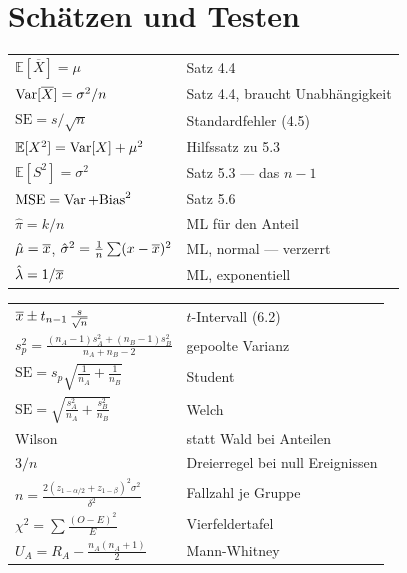 \section{Schätzen und Testen}

\begin{merksatz}
\begin{center}
{\small
\renewcommand{\arraystretch}{1.6}
\begin{tabular}{@{}P{4.4cm}P{4.2cm}@{}}
\toprule
$\mathbb{E}[\overline X] = \mu$ & Satz 4.4\\
$\operatorname{Var}[\overline X] = \sigma^2/n$ & Satz 4.4, braucht Unabhängigkeit\\
$\mathrm{SE} = s/\sqrt n$ & Standardfehler (4.5)\\
$\mathbb{E}[X^2] = \operatorname{Var}[X] + \mu^2$ & Hilfssatz zu 5.3\\
$\mathbb{E}[S^2] = \sigma^2$ & Satz 5.3 --- das $n-1$\\
$\mathrm{MSE} = \operatorname{Var} + \mathrm{Bias}^2$ & Satz 5.6\\
$\hat\pi = k/n$ & ML für den Anteil\\
$\hat\mu = \overline{x}$, $\hat\sigma^2 = \frac1n\sum(x-\overline{x})^2$ & ML, normal --- verzerrt\\
$\hat\lambda = 1/\overline{x}$ & ML, exponentiell\\
\bottomrule
\end{tabular}}
\end{center}
\end{merksatz}

\begin{merksatz}
\begin{center}
{\small
\renewcommand{\arraystretch}{1.6}
\begin{tabular}{@{}P{4.4cm}P{4.2cm}@{}}
\toprule
$\overline{x} \pm t_{n-1}\,\frac{s}{\sqrt n}$ & $t$-Intervall (6.2)\\
$s_p^2 = \frac{(n_A-1)s_A^2+(n_B-1)s_B^2}{n_A+n_B-2}$ & gepoolte Varianz\\
$\mathrm{SE} = s_p\sqrt{\frac{1}{n_A}+\frac{1}{n_B}}$ & Student\\
$\mathrm{SE} = \sqrt{\frac{s_A^2}{n_A}+\frac{s_B^2}{n_B}}$ & Welch\\
Wilson & statt Wald bei Anteilen\\
$3/n$ & Dreierregel bei null Ereignissen\\
$n = \frac{2(z_{1-\alpha/2}+z_{1-\beta})^2\sigma^2}{\delta^2}$ & Fallzahl je Gruppe\\
$\chi^2 = \sum \frac{(O-E)^2}{E}$ & Vierfeldertafel\\
$U_A = R_A - \frac{n_A(n_A+1)}{2}$ & Mann-Whitney\\
\bottomrule
\end{tabular}}
\end{center}
\end{merksatz}

